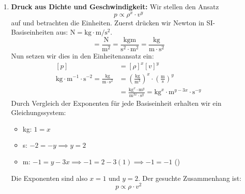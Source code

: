 \documentclass[ngerman]{scrreprt}
\newenvironment{loesungbox}[1]
  {\needspace{5\baselineskip}\begin{loesungboxstyle}[frametitle={#1}]}
  {\end{loesungboxstyle}}
\begin{document}
\begin{loesungbox}{Lösung zu \Cref{aufg:dimensionsanalyse}}
\begin{enumerate}
    \item \textbf{Druck aus Dichte und Geschwindigkeit:}
    Wir stellen den Ansatz 
    \begin{equation}
        p \propto \rho^x \cdot v^y
    \end{equation} 
    auf und betrachten die Einheiten. Zuerst drücken wir Newton in SI-Basiseinheiten aus: $\si{\newton} = \si{\kilo\gram} \cdot \si{\meter\per\second\squared}$.
    \begin{equation}
        [p] = \frac{\si{\newton}}{\si{\meter\squared}} = \frac{\si{\kilo\gram\meter}}{\si{\second\squared}\cdot\si{\meter\squared}} = \frac{\si{\kilo\gram}}{\si{\meter\cdot\second\squared}}
    \end{equation}
    Nun setzen wir dies in den Einheitenansatz ein:
    \begin{equation}\begin{aligned}
        [p] &= {[\rho]}^x {[v]}^y \\
        \si{\kilo\gram} \cdot \si{\meter}^{-1} \cdot \si{\second}^{-2} = \frac{\si{\kilo\gram}}{\si{\meter\cdot\second\squared}} &= {\left(\frac{\si{\kilo\gram}}{\si{\meter\cubed}}\right)}^x \cdot {\left(\frac{\si{\meter}}{\si{\second}}\right)}^y \\
        &= \frac{\si{\kilo\gram}^x \cdot \si{\meter}^y}{\si{\meter}^{3x} \cdot \si{\second}^y} = \si{\kilo\gram}^x \cdot \si{\meter}^{y-3x} \cdot \si{\second}^{-y}
    \end{aligned}\end{equation}
    Durch Vergleich der Exponenten für jede Basiseinheit erhalten wir ein Gleichungssystem:
    \begin{itemize}
        \item \si{\kilo\gram}: $1 = x$
        \item \si{\second}: $-2 = -y \implies y = 2$
        \item \si{\meter}: $-1 = y - 3x \implies -1 = 2 - 3(1) \implies -1 = -1$ \;(\wA)
    \end{itemize}
    Die Exponenten sind also $x=1$ und $y=2$. Der gesuchte Zusammenhang ist:
    \begin{equation}\label{eq: druck_rho_v}
        p \propto \rho \cdot v^2
    \end{equation}
    

\end{enumerate}
\end{loesungbox}
\end{document}
